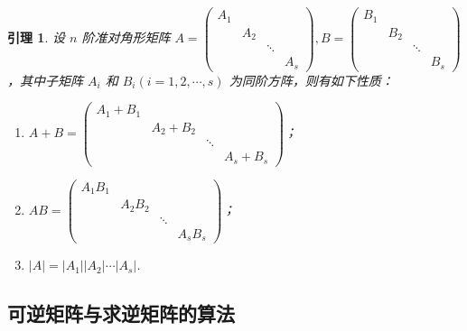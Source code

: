 \documentclass[zihao=-4,UTF8,linespread=1.8,nothm]{aytony_base}
\newtheorem{lemma}{\indent 引理}[subsection]
\begin{document}
\begin{lemma}
    设 $n$ 阶准对角形矩阵 $A = \left(
        \begin{matrix}
            A_1 &     &        &     \\
                & A_2 &        &     \\
                &     & \ddots &     \\
                &     &        & A_s
        \end{matrix}
        \right), B = \left(
        \begin{matrix}
            B_1 &     &        &     \\
                & B_2 &        &     \\
                &     & \ddots &     \\
                &     &        & B_s
        \end{matrix}
        \right)$，其中子矩阵 $A_i$ 和 $B_i(i = 1, 2, \cdots, s)$ 为同阶方阵，则有如下性质：
    \begin{enumerate}[nosep]
        \item $A+B = \left(
                  \begin{matrix}
                      A_1 + B_1 &           &        &           \\
                                & A_2 + B_2 &        &           \\
                                &           & \ddots &           \\
                                &           &        & A_s + B_s
                  \end{matrix}
                  \right)$；
        \item $AB = \left(
                  \begin{matrix}
                      A_1B_1 &        &        &        \\
                             & A_2B_2 &        &        \\
                             &        & \ddots &        \\
                             &        &        & A_sB_s
                  \end{matrix}
                  \right)$；
        \item $|A| = |A_1||A_2|\cdots|A_s|$.
    \end{enumerate}
\end{lemma}

\subsection{可逆矩阵与求逆矩阵的算法}
\end{document}
